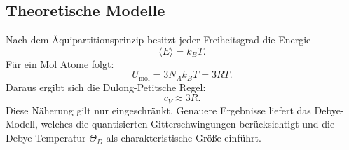 \subsection*{Theoretische Modelle}
Nach dem Äquipartitionsprinzip besitzt jeder Freiheitsgrad die Energie
\begin{equation}
    \langle E \rangle = k_B T.
    \label{eq:aquipartition}
\end{equation}
Für ein Mol Atome folgt:
\begin{equation}
    U_{\text{mol}} = 3 N_A k_B T = 3 R T.
    \label{eq:energie_mol}
\end{equation}
Daraus ergibt sich die Dulong-Petitsche Regel:
\begin{equation}
    c_V \approx 3R.
    \label{eq:dulong_petit}
\end{equation}
Diese Näherung gilt nur eingeschränkt. Genauere Ergebnisse liefert das Debye-Modell, welches die quantisierten Gitterschwingungen berücksichtigt und die Debye-Temperatur \(\Theta_D\) als charakteristische Größe einführt.
